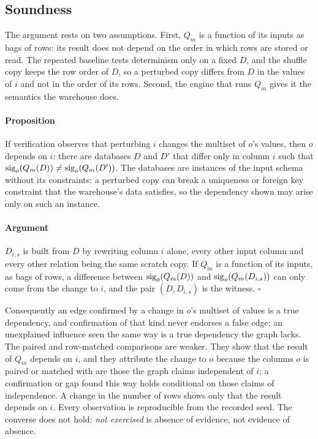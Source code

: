 \subsection{Soundness}

The argument rests on two assumptions. First, $Q_m$ is a function of its inputs as bags of rows:
its result does not depend on the order in which rows are stored or read. The repeated baseline
tests determinism only on a fixed $D$, and the shuffle copy keeps the row order of $D$, so a
perturbed copy differs from $D$ in the values of $i$ and not in the order of its rows. Second,
the engine that runs $Q_m$ gives it the semantics the warehouse does.

\paragraph{Proposition} If verification observes that perturbing $i$ changes the multiset of $o$'s
values, then $o$ depends on $i$: there are databases $D$ and $D'$ that differ only in column $i$
such that $\operatorname{sig}_o(Q_m(D)) \neq \operatorname{sig}_o(Q_m(D'))$. The databases are instances of the input schema
without its constraints: a perturbed copy can break a uniqueness or foreign key constraint that
the warehouse's data satisfies, so the dependency shown may arise only on such an instance.

\paragraph{Argument} $D_{i,s}$ is built from $D$ by rewriting column $i$ alone, every other input
column and every other relation being the same scratch copy. If $Q_m$ is a function of its inputs,
as bags of rows, a difference between $\operatorname{sig}_o(Q_m(D))$ and $\operatorname{sig}_o(Q_m(D_{i,s}))$ can only come
from the change to $i$, and the pair $(D, D_{i,s})$ is the witness. $\square$

\noindent Consequently an edge confirmed by a change in $o$'s multiset of values is a true
dependency, and confirmation of that kind never endorses a false edge; an unexplained influence
seen the same way is a true dependency the graph lacks. The paired and row-matched comparisons
are weaker. They show that the result of $Q_m$ depends on $i$, and they attribute the change to
$o$ because the columns $o$ is paired or matched with are those the graph claims independent of
$i$; a confirmation or gap found this way holds conditional on those claims of independence. A
change in the number of rows shows only that the result depends on $i$. Every observation is
reproducible from the recorded seed. The converse does not hold: \emph{not exercised} is absence
of evidence, not evidence of absence.

